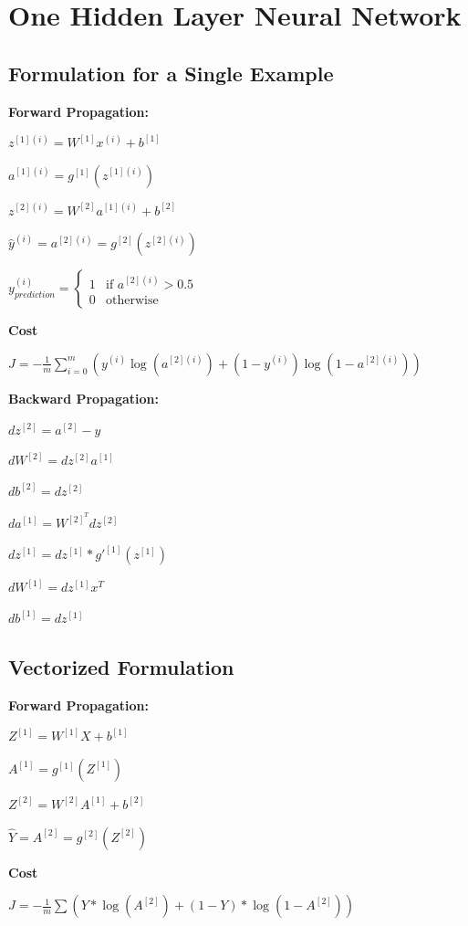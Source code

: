 \section{One Hidden Layer Neural Network}

\subsection{Formulation for a Single Example}

\textbf{Forward Propagation:}

$z^{[1] (i)} =  W^{[1]} x^{(i)} + b^{[1]}$

$a^{[1] (i)} = g^{[1]}(z^{[1] (i)})$

$z^{[2] (i)} = W^{[2]} a^{[1] (i)} + b^{[2]}$

$\hat{y}^{(i)} = a^{[2] (i)} = g^{[2]}(z^{ [2] (i)})$

$y^{(i)}_{prediction} = \begin{cases} 1 & \mbox{if } a^{[2](i)} > 0.5 \\ 0 & \mbox{otherwise } \end{cases}$

\textbf{Cost}

$J = - \frac{1}{m} \sum_{i = 0}^{m} ( y^{(i)}\log(a^{[2] (i)}) + (1-y^{(i)})\log(1- a^{[2] (i)}))$

\textbf{Backward Propagation:}

$dz^{[2]} = a^{[2]} - y$

$dW^{[2]} = dz^{[2]} a^{[1]}$

$db^{[2]} = dz^{[2]}$

$da^{[1]} = W^{[2]^T} dz^{[2]}$

$dz^{[1]} = dz^{[1]} * g'^{[1]} (z^{[1]})$

$dW^{[1]} = dz^{[1]} x^T$

$db^{[1]} = dz^{[1]}$

\subsection{Vectorized Formulation}

\textbf{Forward Propagation:}

$Z^{[1]} =  W^{[1]} X + b^{[1]}$

$A^{[1]} = g^{[1]}(Z^{[1]})$

$Z^{[2]} = W^{[2]} A^{[1]} + b^{[2]}$

$\hat{Y} = A^{[2]} = g^{[2]}(Z^{[2]})$

\textbf{Cost}

$J = - \frac{1}{m} \sum ( Y * \log(A^{[2]}) + (1-Y) * \log(1- A^{[2]}))$

